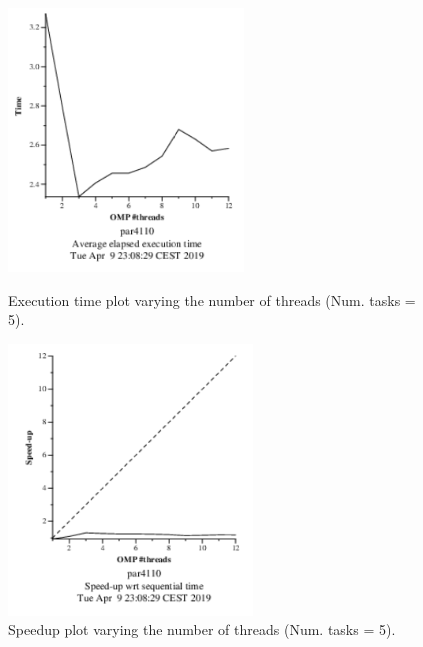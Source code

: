 \documentclass[12pt, a4paper]{article}
\begin{document}
\begin{figure}[H]
\centering
\begin{minipage}[b]{0.4\linewidth}
  \centering
  \includegraphics[scale=1.5]{./mandel-omp-10000-strong-omp-3-5-time}
  \caption{Execution time plot varying the number of threads (Num. tasks = 5).}
  \label{fig:mandel-omp-10000-strong-omp-3-5-time}
\end{minipage}%
\hspace{0.5cm}
\begin{minipage}[b]{0.4\linewidth}
  \centering
  \includegraphics[scale=1.5]{./mandel-omp-10000-strong-omp-3-5-speedup}
  \caption{Speedup plot varying the number of threads (Num. tasks = 5).}
  \label{fig:mandel-omp-10000-strong-omp-3-5-speedup}
\end{minipage}
\end{figure}
\end{document}
